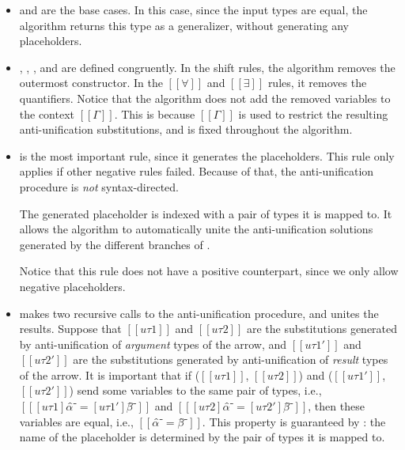 \documentclass[acmsmall,natbib=false,review,anonymous]{acmart}
\begin{document}
\begin{itemize}
  \item {} and 
    are the base cases. 
    In this case, since the input types are equal, 
    the algorithm returns this type as a generalizer,
    without generating any placeholders.

  \item {}, ,
    , and 
    are defined congruently. In the shift rules, the algorithm
    removes the outermost constructor. In the
    $[[∀]]$ and $[[∃]]$ rules, it removes the quantifiers.
    Notice that the algorithm does not add the removed variables to
    the context $[[Γ]]$. This is because $[[Γ]]$
    is used to restrict the resulting anti-unification substitutions, 
    and is fixed throughout the algorithm.

  \item {} is the most important rule, 
    since it generates the placeholders. 
    This rule only applies if other negative rules failed.
    Because of that, the anti-unification procedure is 
    \emph{not} syntax-directed. 

    The generated placeholder is indexed with a pair of 
    types it is mapped to. It allows the algorithm to 
    automatically unite the anti-unification solutions 
    generated by the different branches of 
    .

    Notice that this rule does not have a positive counterpart,
    since we only allow negative placeholders.

  \item {}
    makes two recursive calls to the anti-unification procedure,
    and unites the results. Suppose that
    $[[uτ1]]$  and $[[uτ2]]$ are the substitutions generated by
    anti-unification of \emph{argument} types of the arrow,
    and $[[uτ1']]$ and $[[uτ2']]$ are the substitutions generated by 
    anti-unification of \emph{result} types of the arrow.
    It is important that if ($[[uτ1]]$, $[[uτ2]]$)
    and ($[[uτ1']]$, $[[uτ2']]$) send some variables to the same pair of types,
    i.e., $[[ [uτ1]α̂⁻ = [uτ1']β̂⁻]]$ and $[[ [uτ2]α̂⁻ = [uτ2']β̂⁻]]$,
    then these variables are equal, i.e., $[[α̂⁻ = β̂⁻]]$.
    This property is guaranteed by :
    the name of the placeholder is determined by the pair of 
    types it is mapped to.
\end{itemize}
\end{document}
